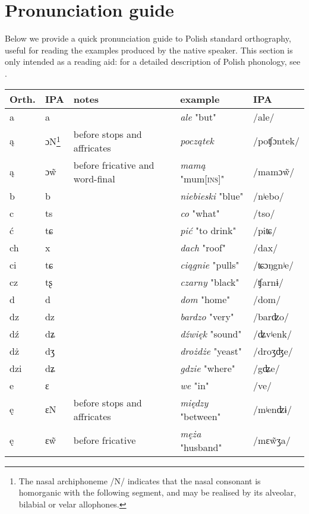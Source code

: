 \chapter{Pronunciation guide}\label{sec:9}
Below we provide a quick pronunciation guide to Polish standard orthography, useful for reading the examples produced by the native speaker. This section is only intended as a reading aid: for a detailed description of Polish phonology, see \citet{Gussman2007}.

{\centering
\footnotesize
    \begin{tabular}{lllll}
        \lsptoprule
        Orth. & IPA & notes & example & IPA\\
        \midrule
        a & a &  & \textit{ale} "but" & /ale/\\
        ą & ɔN\footnote{The nasal archiphoneme /N/ indicates that the nasal consonant is homorganic with the following segment, and may be realised by its alveolar, bilabial or velar allophones.} & before stops  and affricates & \textit{początek} & /poʧɔntek/\\
        ą & ɔ\~{w} & before fricative and word-final & \textit{mamą} "mum\textsc{[ins]}" & /mamɔ\~{w}/\\
        b & b &  & \textit{niebieski} "blue" & /nʲebo/\\
        c & ts &  & \textit{co} "what" & /tso/\\
        ć & tɕ &  & \textit{pić} "to drink" & /piʨ/\\
        ch & x &  & \textit{dach} "roof" & /dax/\\
        ci & tɕ &  & \textit{ciągnie} "pulls" & /ʨɔŋgnʲe/\\
        cz & tʂ &  & \textit{czarny} "black" & /ʧarnɨ/\\
        d & d &  & \textit{dom} "home" & /dom/\\
        dz & dz &  & \textit{bardzo} "very" & /barʣo/\\
        dź & dʑ &  & \textit{dźwięk} "sound" & /ʥvʲenk/\\
        dż & dʒ &  & \textit{drożdże} "yeast" & /droʒʤe/\\
        dzi & dʑ &  & \textit{gdzie} "where" & /gʥe/\\
        e & ɛ &  & \textit{we} "in" & /ve/\\
        ę & ɛN & before stops and affricates & \textit{między} "between" & /mʲenʣɨ/\\
        ę & ɛ\~{w} & before fricative & \textit{męża} "husband" & /mɛ\~{w}ʒa/\\

\end{tabular}}
